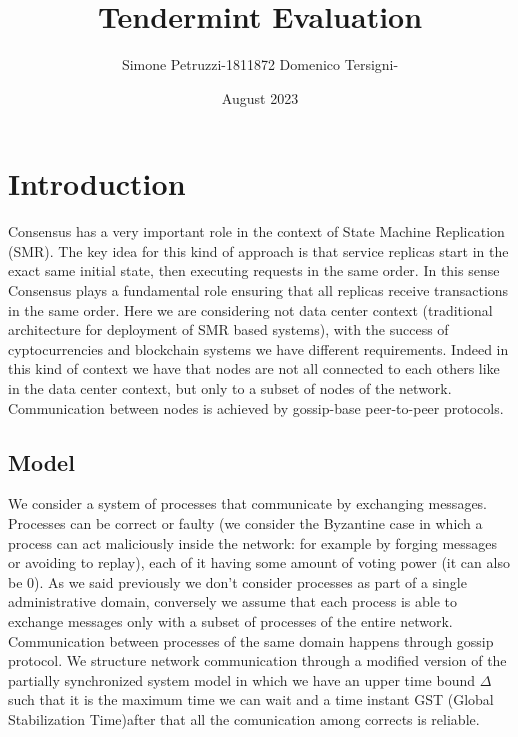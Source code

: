 \documentclass{article}
\title{Tendermint Evaluation}
\author{Simone Petruzzi-1811872 Domenico Tersigni-}
\date{August 2023}
\begin{document}
   \maketitle
   \section{Introduction}
   Consensus has a very important role in the context of State Machine Replication (SMR). The key idea for this kind of approach is that service replicas start in the exact same initial state, then executing requests in the same order. In this sense Consensus plays a fundamental role ensuring that all replicas receive transactions in the same order.
   \newline
   \newline
   Here we are considering not data center context (traditional architecture for deployment of SMR based systems), with the success of cyptocurrencies and blockchain systems we have different requirements. Indeed in this kind of context we have that nodes are not all connected to each others like in the data center context, but only to a subset of nodes of the network. Communication between nodes is achieved by gossip-base peer-to-peer protocols.
   \subsection{Model}
   We consider a system of processes that communicate by exchanging messages. Processes can be correct or faulty (we consider the Byzantine case in which a process can act maliciously inside the network: for example by forging messages or avoiding to replay), each of it having some amount of voting power (it can also be 0). As we said previously we don't consider processes as part of a single administrative domain, conversely we assume that each process is able to exchange messages only with a subset of processes of the entire network. Communication between processes of the same domain happens through gossip protocol. We structure network communication through a modified version of the partially synchronized system model in which we have an upper time bound $\Delta$ such that it is the maximum time we can wait and a time instant GST (Global Stabilization Time)after that all the comunication among corrects is reliable.
\end{document}
